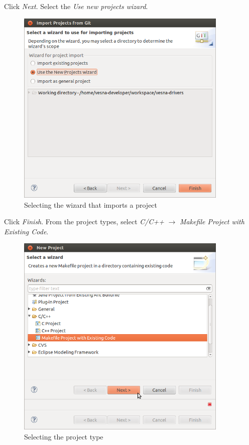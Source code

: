 \documentclass[a4paper, 10pt]{article}
\begin{document}
Click \emph{Next}.
Select the \emph{Use new projects wizard}.

    \begin{figure}[H]
    \centering
        \includegraphics[width=0.9\textwidth]{./install-guide-linux-images/test-select-wizard.png}
        \caption{Selecting the wizard that imports a project}
        \label{fig:test-select-wizard}
    \end{figure}

Click \emph{Finish}.
From the project types, select \emph{C/C++} $\rightarrow$
\emph{Makefile Project with Existing Code}.

    \begin{figure}[H]
    \centering
        \includegraphics[width=0.9\textwidth]{./install-guide-linux-images/test-select-project-type.png}
        \caption{Selecting the project type}
        \label{fig:test-select-project-type}
    \end{figure}
\end{document}
